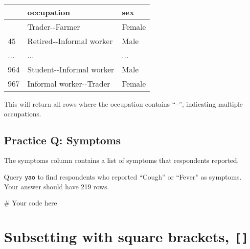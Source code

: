 \documentclass[
  letterpaper,
  DIV=11,
  numbers=noendperiod]{scrreprt}
\newenvironment{Shaded}{\begin{snugshade}}{\end{snugshade}}
\newcommand{\CommentTok}[1]{\textcolor[rgb]{0.37,0.37,0.37}{#1}}
\begin{document}
\begin{longtable}[]{@{}lll@{}}
\toprule\noalign{}
& occupation & sex \\
\midrule\noalign{}
\endhead
\bottomrule\noalign{}
\endlastfoot
4 & Trader-\/-Farmer & Female \\
45 & Retired-\/-Informal worker & Male \\
... & ... & ... \\
964 & Student-\/-Informal worker & Male \\
967 & Informal worker-\/-Trader & Female \\
\end{longtable}

This will return all rows where the occupation contains ``--'',
indicating multiple occupations.

\begin{tcolorbox}[enhanced jigsaw, colframe=quarto-callout-tip-color-frame, opacityback=0, titlerule=0mm, bottomrule=.15mm, breakable, leftrule=.75mm, colbacktitle=quarto-callout-tip-color!10!white, title=\textcolor{quarto-callout-tip-color}{\faLightbulb}\hspace{0.5em}{Practice}, rightrule=.15mm, coltitle=black, opacitybacktitle=0.6, colback=white, left=2mm, arc=.35mm, toptitle=1mm, bottomtitle=1mm, toprule=.15mm]

\subsection{Practice Q: Symptoms}\label{practice-q-symptoms}

The symptoms column contains a list of symptoms that respondents
reported.

Query \texttt{yao} to find respondents who reported ``Cough'' or
``Fever'' as symptoms. Your answer should have 219 rows.

\begin{Shaded}
\begin{Highlighting}[]
\CommentTok{\# Your code here}
\end{Highlighting}
\end{Shaded}

\end{tcolorbox}

\section{\texorpdfstring{Subsetting with square brackets,
\texttt{{[}{]}}}{Subsetting with square brackets, {[}{]}}}\label{subsetting-with-square-brackets}
\end{document}
